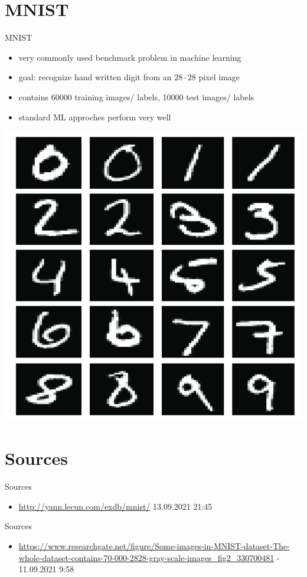 \documentclass{beamer}
\begin{document}
\section{MNIST}

\begin{frame}{MNIST}
\begin{itemize}
	\item very commonly used benchmark problem in machine learning
	\item goal: recognize hand written digit from an \(28 \cdot 28\) pixel image
	\item contains 60000 training images/ labels, 10000 test images/ labels
	\item standard ML approches perform very well
\end{itemize}
\begin{center}
	\includegraphics[scale=0.15]{source/mnist.png}
\end{center}
\end{frame}


\section{Sources}
\begin{frame}{Sources}
\tiny
\begin{itemize}
	\item \url{http://yann.lecun.com/exdb/mnist/} 13.09.2021 21:45
\end{itemize}
\end{frame}

\begin{frame}{Sources}
\tiny
\begin{itemize}
	\item \url{https://www.researchgate.net/figure/Some-images-in-MNIST-dataset-The-whole-dataset-contains-70-000-2828-gray-scale-images_fig2_330700481} - 11.09.2021 9:58
\end{itemize}
\end{frame}
\end{document}
